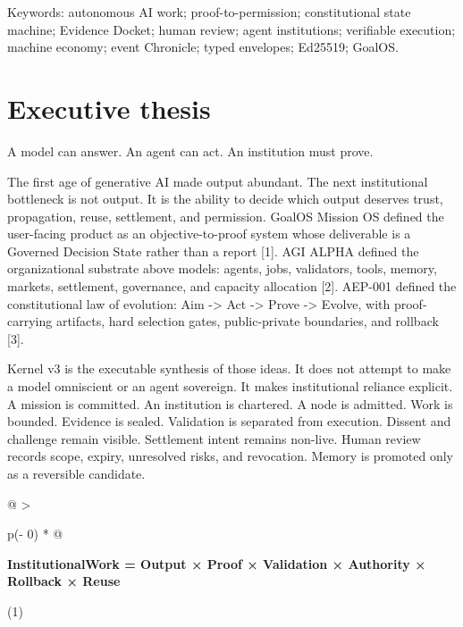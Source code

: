 Keywords: autonomous AI work; proof-to-permission; constitutional state
machine; Evidence Docket; human review; agent institutions; verifiable
execution; machine economy; event Chronicle; typed envelopes; Ed25519;
GoalOS.

\section{Executive thesis}\label{executive-thesis}

A model can answer. An agent can act. An institution must prove.

The first age of generative AI made output abundant. The next
institutional bottleneck is not output. It is the ability to decide
which output deserves trust, propagation, reuse, settlement, and
permission. GoalOS Mission OS defined the user-facing product as an
objective-to-proof system whose deliverable is a Governed Decision State
rather than a report {[}1{]}. AGI ALPHA defined the organizational
substrate above models: agents, jobs, validators, tools, memory,
markets, settlement, governance, and capacity allocation {[}2{]}.
AEP-001 defined the constitutional law of evolution: Aim -\textgreater{}
Act -\textgreater{} Prove -\textgreater{} Evolve, with proof-carrying
artifacts, hard selection gates, public-private boundaries, and rollback
{[}3{]}.

Kernel v3 is the executable synthesis of those ideas. It does not
attempt to make a model omniscient or an agent sovereign. It makes
institutional reliance explicit. A mission is committed. An institution
is chartered. A node is admitted. Work is bounded. Evidence is sealed.
Validation is separated from execution. Dissent and challenge remain
visible. Settlement intent remains non-live. Human review records scope,
expiry, unresolved risks, and revocation. Memory is promoted only as a
reversible candidate.

\begin{longtable}[]{@{}
  >{\raggedright\arraybackslash}p{(\columnwidth - 0\tabcolsep) * }@{}}
\toprule\noalign{}
\begin{minipage}[b]{\linewidth}\raggedright
\textbf{InstitutionalWork = Output × Proof × Validation × Authority ×
Rollback × Reuse}

(1)
\end{minipage} \\
\midrule\noalign{}
\endhead
\bottomrule\noalign{}
\endlastfoot
\end{longtable}

